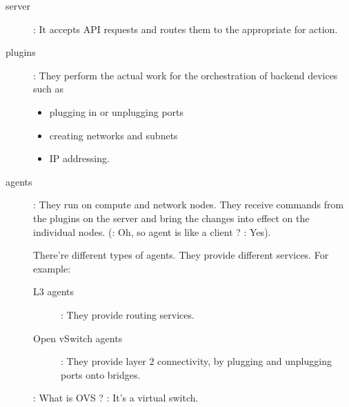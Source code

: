 \documentclass[dvipsnames]{article}
\begin{document}
\begin{description}
\item[server] : It accepts API requests and routes them to the appropriate
   for action.
\item[plugins] : They perform the actual work for the orchestration of backend devices such as
  \begin{itemize}
  \item plugging in or unplugging ports
  \item creating networks and subnets
  \item IP addressing.
  \end{itemize}
\item[agents] : They run on compute and network nodes. They receive commands
  from the plugins on the server and bring the changes into effect on the
  individual nodes. (: Oh, so agent is like a client ?
  : Yes).

  There're different types of agents. They provide different services. For example:
  \begin{description}
  \item[L3 agents] : They provide routing services.
  \item[Open vSwitch agents] : They provide layer 2 connectivity, by plugging
    and unplugging ports onto  bridges.
  \end{description}
  : What is OVS ? : It's a virtual switch.

\end{description}
\end{document}
